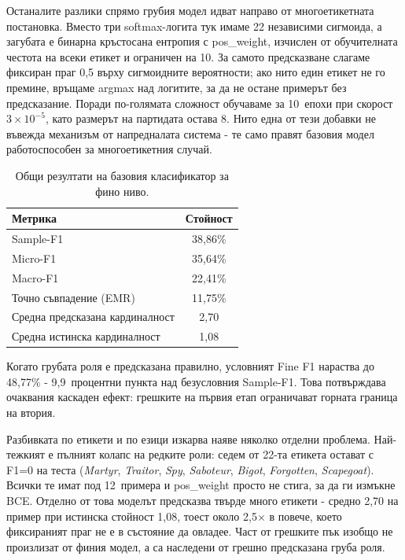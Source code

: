 \documentclass[12pt,a4paper]{report}
\begin{document}
Останалите разлики спрямо грубия модел идват направо от многоетикетната постановка. Вместо три softmax-логита тук имаме 22 независими сигмоида, а загубата е бинарна кръстосана ентропия с pos\_weight, изчислен от обучителната честота на всеки етикет и ограничен на 10. За самото предсказване слагаме фиксиран праг 0,5 върху сигмоидните вероятности; ако нито един етикет не го премине, връщаме argmax над логитите, за да не остане примерът без предсказание. Поради по-голямата сложност обучаваме за 10~епохи при скорост $3\times10^{-5}$, като размерът на партидата остава 8. Нито една от тези добавки не въвежда механизъм от напредналата система - те само правят базовия модел работоспособен за многоетикетния случай.

\begin{table}[H]
\centering
\caption{Общи резултати на базовия класификатор за фино ниво.}
\label{tab:fine_baseline_results}
\begin{tabular}{lc}
\toprule
\textbf{Метрика} & \textbf{Стойност} \\
\midrule
Sample-F1 & 38,86\% \\
Micro-F1 & 35,64\% \\
Macro-F1 & 22,41\% \\
Точно съвпадение (EMR) & 11,75\% \\
Средна предсказана кардиналност & 2,70 \\
Средна истинска кардиналност & 1,08 \\
\bottomrule
\end{tabular}
\end{table}

Когато грубата роля е предсказана правилно, условният Fine F1 нараства до 48,77\% - 9,9~процентни пункта над безусловния Sample-F1. Това потвърждава очаквания каскаден ефект: грешките на първия етап ограничават горната граница на втория.

Разбивката по етикети и по езици изкарва наяве няколко отделни проблема. Най-тежкият е пълният колапс на редките роли: седем от 22-та етикета остават с F1=0 на теста (\textit{Martyr}, \textit{Traitor}, \textit{Spy}, \textit{Saboteur}, \textit{Bigot}, \textit{Forgotten}, \textit{Scapegoat}). Всички те имат под 12~примера и pos\_weight просто не стига, за да ги измъкне BCE. Отделно от това моделът предсказва твърде много етикети - средно 2,70 на пример при истинска стойност 1,08, тоест около 2,5$\times$ в повече, което фиксираният праг не е в състояние да овладее. Част от грешките пък изобщо не произлизат от финия модел, а са наследени от грешно предсказана груба роля.
\end{document}
